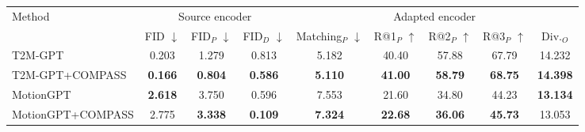 \begin{tabular*}{\textwidth}{@{\extracolsep{\fill}}l*{8}{c}@{}}
\toprule
Method & \multicolumn{3}{c}{Source encoder} & \multicolumn{5}{c}{Adapted encoder} \\
\cmidrule(lr){2-4}\cmidrule(lr){5-9}
 & FID $\downarrow$ & FID$_P$ $\downarrow$ & FID$_D$ $\downarrow$ & Matching$_P$ $\downarrow$ & R@1$_P$ $\uparrow$ & R@2$_P$ $\uparrow$ & R@3$_P$ $\uparrow$ & Div.$_O$ \\
\midrule
T2M-GPT & 0.203 & 1.279 & 0.813 & 5.182 & 40.40 & 57.88 & 67.79 & 14.232 \\
T2M-GPT+COMPASS & \textbf{0.166} & \textbf{0.804} & \textbf{0.586} & \textbf{5.110} & \textbf{41.00} & \textbf{58.79} & \textbf{68.75} & \textbf{14.398} \\
\midrule
MotionGPT & \textbf{2.618} & 3.750 & 0.596 & 7.553 & 21.60 & 34.80 & 44.23 & \textbf{13.134} \\
MotionGPT+COMPASS & 2.775 & \textbf{3.338} & \textbf{0.109} & \textbf{7.324} & \textbf{22.68} & \textbf{36.06} & \textbf{45.73} & 13.053 \\
\bottomrule
\end{tabular*}
